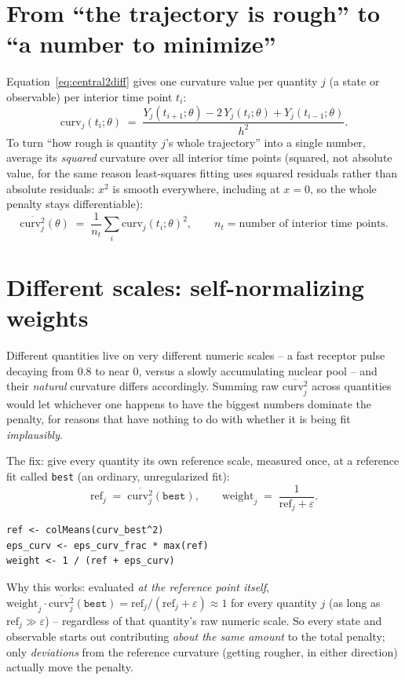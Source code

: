 \documentclass[11pt]{article}
\newcommand{\code}[1]{\texttt{#1}}
\begin{document}
\section{From ``the trajectory is rough'' to ``a number to minimize''}

Equation~\eqref{eq:central2diff} gives one curvature value per quantity $j$
(a state or observable) per interior time point $t_i$:
\[
  \mathrm{curv}_j(t_i;\theta) \;=\; \frac{Y_j(t_{i+1};\theta) - 2\,Y_j(t_i;\theta) + Y_j(t_{i-1};\theta)}{h^2}.
\]
To turn ``how rough is quantity $j$'s whole trajectory'' into a single
number, average its \emph{squared} curvature over all interior time points
(squared, not absolute value, for the same reason least-squares fitting uses
squared residuals rather than absolute residuals: $x^2$ is smooth
everywhere, including at $x=0$, so the whole penalty stays differentiable):
\[
  \overline{\mathrm{curv}_j^2}(\theta) \;=\; \frac{1}{n_t}\sum_{i} \mathrm{curv}_j(t_i;\theta)^2,
  \qquad n_t = \text{number of interior time points}.
\]

\section{Different scales: self-normalizing weights}

Different quantities live on very different numeric scales -- a fast
receptor pulse decaying from $0.8$ to near $0$, versus a slowly accumulating
nuclear pool -- and their \emph{natural} curvature differs accordingly.
Summing raw $\overline{\mathrm{curv}_j^2}$ across quantities would let
whichever one happens to have the biggest numbers dominate the penalty, for
reasons that have nothing to do with whether it is being fit
\emph{implausibly}.

The fix: give every quantity its own reference scale, measured once, at a
reference fit called \code{best} (an ordinary, unregularized fit):
\[
  \mathrm{ref}_j \;=\; \overline{\mathrm{curv}_j^2}(\code{best}),
  \qquad
  \mathrm{weight}_j \;=\; \frac{1}{\mathrm{ref}_j + \varepsilon}.
\]
\begin{lstlisting}
ref <- colMeans(curv_best^2)
eps_curv <- eps_curv_frac * max(ref)
weight <- 1 / (ref + eps_curv)
\end{lstlisting}
Why this works: evaluated \emph{at the reference point itself},
$\mathrm{weight}_j \cdot \overline{\mathrm{curv}_j^2}(\code{best}) =
\mathrm{ref}_j/(\mathrm{ref}_j+\varepsilon) \approx 1$ for every quantity
$j$ (as long as $\mathrm{ref}_j \gg \varepsilon$) -- regardless of that
quantity's raw numeric scale. So every state and observable starts out
contributing \emph{about the same amount} to the total penalty; only
\emph{deviations} from the reference curvature (getting rougher, in either
direction) actually move the penalty.
\end{document}
